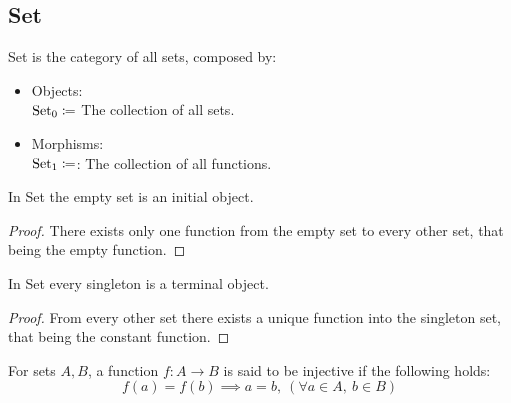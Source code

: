 \subsection{Set}
\begin{definition}
  Set is the category of all sets, composed by:
  \parencite{awodey:category_theory}
  \begin{itemize}
    \item Objects:\\
      $\mathrm{Set}_0\coloneqq$ The collection of all sets.
    \item Morphisms:\\
      $\mathrm{Set}_1\coloneqq$: The collection of all functions.
  \end{itemize}
\end{definition}

\begin{theorem}
  In Set the empty set is an initial object.

  \begin{proof}
    There exists only one function from the empty set to every other set, that
    being the empty function.
  \end{proof}
\end{theorem}

\begin{theorem}
  In Set every singleton is a terminal object.

  \begin{proof}
    From every other set there exists a unique function into the singleton set,
    that being the constant function.
  \end{proof}
\end{theorem}

\begin{definition}
  For sets $A,B$, a function $f:A\to B$ is said to be injective if the following
  holds:
  \[f(a)=f(b) \implies a=b,\ (\forall a\in A,\ b\in B)\]
\end{definition}

